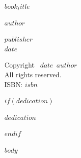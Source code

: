 \documentclass[12pt]{memoir}
\def\booktitle{$book_title$}
\def\bookauthor{$author$}
\def\bookdate{$date$}
\def\bookpublisher{$publisher$}
\begin{document}
\thispagestyle{empty}
\vspace*{1in}
\begin{center}
{\Huge\scshape\booktitle\par}
\vspace{1in}
{\Large\scshape\bookauthor\par}
\vfill
{\large\scshape\bookpublisher}\\
{\scshape\bookdate}
\end{center}

\clearpage
\thispagestyle{empty}
\vspace*{\fill}
\begin{center}
Copyright \textcopyright\ \bookdate\ \bookauthor\\
\bigskip
All rights reserved.\\
\bigskip
ISBN: $isbn$
\end{center}
\vspace*{\fill}

$if(dedication)$
\clearpage
\thispagestyle{empty}
\vspace*{3in}
\begin{center}
\textit{$dedication$}
\end{center}
$endif$

\clearpage
\tableofcontents

$body$
\end{document}
